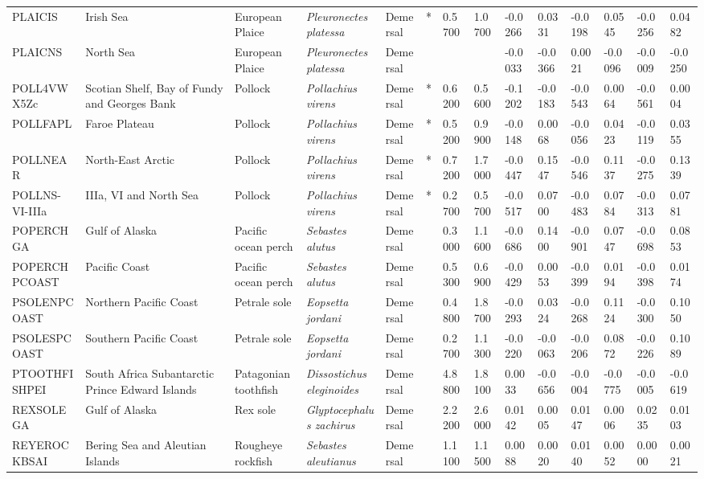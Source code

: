 \begin{longtable}{p{2.6cm}p{1.9cm}p{1.7cm}p{1.6cm}p{1cm}p{0.3cm}p{1cm}p{1cm}p{1cm}p{1.1cm}p{1cm}p{1.1cm}p{1cm}p{1.1cm}}
  PLAICIS & Irish Sea & European Plaice & \textit{Pleuronectes platessa} & Demersal & * & 0.5700 & 1.0700 & -0.0266 & 0.0331 & -0.0198 & 0.0545 & -0.0256 & 0.0482 \\ 
  PLAICNS & North Sea & European Plaice & \textit{Pleuronectes platessa} & Demersal &  &  &  & -0.0033 & -0.0366 & 0.0021 & -0.0096 & -0.0009 & -0.0250 \\ 
  POLL4VWX5Zc & Scotian Shelf, Bay of Fundy and Georges Bank & Pollock & \textit{Pollachius virens} & Demersal & * & 0.6200 & 0.5600 & -0.1202 & -0.0183 & -0.0543 & 0.0064 & -0.0561 & 0.0004 \\ 
  POLLFAPL & Faroe Plateau & Pollock & \textit{Pollachius virens} & Demersal & * & 0.5200 & 0.9900 & -0.0148 & 0.0068 & -0.0056 & 0.0423 & -0.0119 & 0.0355 \\ 
  POLLNEAR & North-East Arctic & Pollock & \textit{Pollachius virens} & Demersal & * & 0.7200 & 1.7000 & -0.0447 & 0.1547 & -0.0546 & 0.1137 & -0.0275 & 0.1339 \\ 
  POLLNS-VI-IIIa & IIIa, VI and North Sea & Pollock & \textit{Pollachius virens} & Demersal & * & 0.2700 & 0.5700 & -0.0517 & 0.0700 & -0.0483 & 0.0784 & -0.0313 & 0.0781 \\ 
  POPERCHGA & Gulf of Alaska & Pacific ocean perch & \textit{Sebastes alutus} & Demersal &   & 0.3000 & 1.1600 & -0.0686 & 0.1400 & -0.0901 & 0.0747 & -0.0698 & 0.0853 \\ 
  POPERCHPCOAST & Pacific Coast & Pacific ocean perch & \textit{Sebastes alutus} & Demersal &   & 0.5300 & 0.6900 & -0.0429 & 0.0053 & -0.0399 & 0.0194 & -0.0398 & 0.0174 \\ 
  PSOLENPCOAST & Northern Pacific Coast & Petrale sole & \textit{Eopsetta jordani} & Demersal &   & 0.4800 & 1.8700 & -0.0293 & 0.0324 & -0.0268 & 0.1124 & -0.0300 & 0.1050 \\ 
  PSOLESPCOAST & Southern Pacific Coast & Petrale sole & \textit{Eopsetta jordani} & Demersal &   & 0.2700 & 1.1300 & -0.0220 & -0.0063 & -0.0206 & 0.0872 & -0.0226 & 0.1089 \\ 
  PTOOTHFISHPEI & South Africa Subantarctic Prince Edward Islands & Patagonian toothfish & \textit{Dissostichus eleginoides} & Demersal &   & 4.8800 & 1.8100 & 0.0033 & -0.0656 & -0.0004 & -0.0775 & -0.0005 & -0.0619 \\ 
  REXSOLEGA & Gulf of Alaska & Rex sole & \textit{Glyptocephalus zachirus} & Demersal &   & 2.2200 & 2.6000 & 0.0142 & 0.0005 & 0.0147 & 0.0006 & 0.0235 & 0.0103 \\ 
  REYEROCKBSAI & Bering Sea and Aleutian Islands & Rougheye rockfish & \textit{Sebastes aleutianus} & Demersal &   & 1.1100 & 1.1500 & 0.0088 & 0.0020 & 0.0140 & 0.0052 & 0.0000 & 0.0021 \\ 

\end{longtable}
